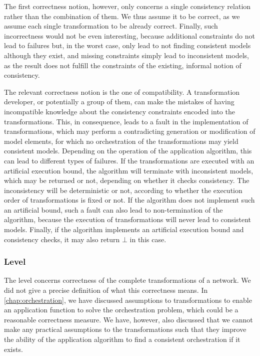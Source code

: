 The first correctness notion, however, only concerns a single consistency relation rather than the combination of them.
We thus assume it to be correct, as we assume each single transformation to be already correct.
Finally, such incorrectness would not be even interesting, because additional constraints do not lead to failures but, in the worst case, only lead to not finding consistent models although they exist, and missing constraints simply lead to inconsistent models, as the result does not fulfill the constraints of the existing, informal notion of consistency.

The relevant correctness notion is the one of compatibility.
A transformation developer, or potentially a group of them, can make the mistakes of having incompatible knowledge about the consistency constraints encoded into the transformations.
This, in consequence, leads to a fault in the implementation of transformations, which may perform a contradicting generation or modification of model elements, for which no orchestration of the transformations may yield consistent models.
Depending on the operation of the application algorithm, this can lead to different types of failures.
If the transformations are executed with an artificial execution bound, the algorithm will terminate with inconsistent models, which may be returned or not, depending on whether it checks consistency.
The inconsistency will be deterministic or not, according to whether the execution order of transformations is fixed or not.
If the algorithm does not implement such an artificial bound, such a fault can also lead to non-termination of the algorithm, because the execution of transformations will never lead to consistent models.
Finally, if the algorithm implements an artificial execution bound and consistency checks, it may also return $\bot$ in this case.

\subsubsection*{\LevelNetworkRule Level}

The \levelnetworkrule level concerns correctness of the complete transformations of a network.
We did not give a precise definition of what this correctness means.
In \autoref{chap:orchestration}, we have discussed assumptions to transformations to enable an application function to solve the orchestration problem, which could be a reasonable correctness measure.
We have, however, also discussed that we cannot make any practical assumptions to the transformations such that they improve the ability of the application algorithm to find a consistent orchestration if it exists.

